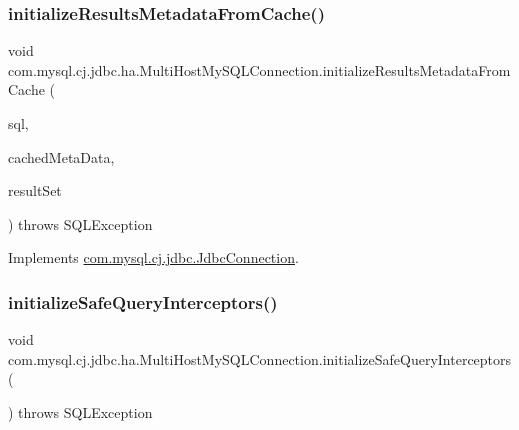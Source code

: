 \subsubsection{\texorpdfstring{initialize\+Results\+Metadata\+From\+Cache()}{initializeResultsMetadataFromCache()}}
{\footnotesize\ttfamily void com.\+mysql.\+cj.\+jdbc.\+ha.\+Multi\+Host\+My\+S\+Q\+L\+Connection.\+initialize\+Results\+Metadata\+From\+Cache (\begin{DoxyParamCaption}\item[{String}]{sql,  }\item[{\mbox{\hyperlink{interfacecom_1_1mysql_1_1cj_1_1jdbc_1_1result_1_1_cached_result_set_meta_data}{Cached\+Result\+Set\+Meta\+Data}}}]{cached\+Meta\+Data,  }\item[{\mbox{\hyperlink{interfacecom_1_1mysql_1_1cj_1_1jdbc_1_1result_1_1_result_set_internal_methods}{Result\+Set\+Internal\+Methods}}}]{result\+Set }\end{DoxyParamCaption}) throws S\+Q\+L\+Exception}



Implements \mbox{\hyperlink{interfacecom_1_1mysql_1_1cj_1_1jdbc_1_1_jdbc_connection_adaeb33edd797d27f3836f5cab30c51d0}{com.\+mysql.\+cj.\+jdbc.\+Jdbc\+Connection}}.

\mbox{\label{classcom_1_1mysql_1_1cj_1_1jdbc_1_1ha_1_1_multi_host_my_s_q_l_connection_a0e3142ef146b788ca33dd4d80c56dd21}} 
\subsubsection{\texorpdfstring{initialize\+Safe\+Query\+Interceptors()}{initializeSafeQueryInterceptors()}}
{\footnotesize\ttfamily void com.\+mysql.\+cj.\+jdbc.\+ha.\+Multi\+Host\+My\+S\+Q\+L\+Connection.\+initialize\+Safe\+Query\+Interceptors (\begin{DoxyParamCaption}{ }\end{DoxyParamCaption}) throws S\+Q\+L\+Exception}



